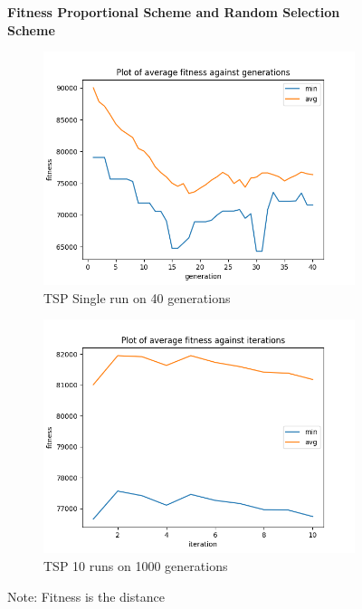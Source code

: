 \documentclass[a4paper]{exam}
\begin{document}
\begin{questions}
  \begin{figure}[!ht]
    \centering
    \textbf{Fitness Proportional Scheme and Random Selection Scheme}
    \begin{subfigure}{.5\textwidth}
      \centering
      \includegraphics[width=1\linewidth]{images/tsp_fps_rd_gen.png}
      \caption{TSP Single run on 40 generations}
      \label{fig:tsp_fps_rd_sub1}
    \end{subfigure}%
    \begin{subfigure}{.5\textwidth}
      \centering
      \includegraphics[width=1\linewidth]{images/tsp_fps_rd_itr.png}
      \caption{TSP 10 runs on 1000 generations}
      \label{fig:tsp_fps_rd_sub2}
    \end{subfigure}
    \caption{Note: Fitness is the distance}
    \label{fig:tsp_fps_rd}
  \end{figure}


\end{questions}
\end{document}
